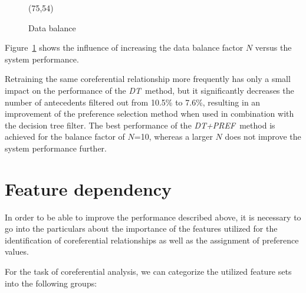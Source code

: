 \begin{figure}[ht]
  \begin{center}
    \vspace*{-0.5\baselineskip}
    \hspace*{-1cm}
\atari(75,54)
    \caption{Data balance}\label{pic-balance}
  \vspace*{-1\baselineskip}
  \end{center}
\end{figure}

Figure~\ref{pic-balance} shows the influence of increasing the data balance factor $N$ versus
the system performance. 

Retraining the same coreferential relationship more frequently has only a small impact on
the performance of the {\small\em DT}\, method, but it significantly decreases the number of antecedents
filtered out from 10.5\% to 7.6\%, resulting in an improvement of the preference selection method
when used in combination with the decision tree filter. The best performance
of the {\small\em DT+PREF}\, method is achieved for the balance factor of $N$=10,
whereas a larger $N$ does not improve the system performance further.

\vspace*{-5mm}

\section{Feature dependency}
\label{feature}

In order to be able to improve the performance described above, it is necessary to go into
the particulars about the importance of the features utilized for the identification of coreferential
relationships as well as the assignment of preference values.

For the task of coreferential analysis, we can categorize the utilized feature sets into the
following groups:

